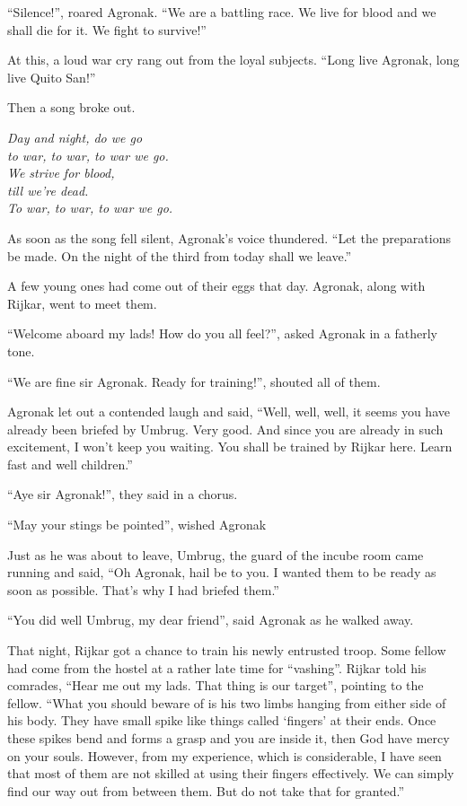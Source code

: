 \documentclass[twoside,11pt,titlepage]{article}
\begin{document}
``Silence!'', roared Agronak. ``We are a battling race. We live for blood and we shall die for it. We fight to survive!''

At this, a loud war cry rang out from the loyal subjects. ``Long live Agronak, long live Quito San!''

Then a song broke out.\\
\medskip
\begin{center}
\emph{Day and night, do we go \\ to war, to war, to war we go. \\We strive for blood, \\till we're dead. \\To war, to war, to war we go.}
\end{center}

As soon as the song fell silent, Agronak's voice thundered. ``Let the preparations be made. On the night of the third from today shall we leave.''

A few young ones had come out of their eggs that day. Agronak, along with Rijkar, went to meet them.

``Welcome aboard my lads! How do you all feel?'', asked Agronak in a fatherly tone.

``We are fine sir Agronak. Ready for training!'', shouted all of them.

Agronak let out a contended laugh and said, ``Well, well, well, it seems you have already been briefed by Umbrug. Very good. And since you are already in such excitement, I won't keep you waiting. You shall be trained by Rijkar here. Learn fast and well children.''

``Aye sir Agronak!'', they said in a chorus.

``May your stings be pointed'', wished Agronak

Just as he was about to leave, Umbrug, the guard of the incube room came running and said, ``Oh Agronak, hail be to you. I wanted them to be ready as soon as possible. That's why I had briefed them.''

``You did well Umbrug, my dear friend'', said Agronak as he walked away.

That night, Rijkar got a chance to train his newly entrusted troop. Some fellow had come from the hostel at a rather late time for ``vashing''. Rijkar told his comrades, ``Hear me out my lads. That thing is our target'', pointing to the fellow. ``What you should beware of is his two limbs hanging from either side of his body. They have small spike like things called `fingers' at their ends. Once these spikes bend and forms a grasp and you are inside it, then God have mercy on your souls. However, from my experience, which is considerable, I have seen that most of them are not skilled at using their fingers effectively. We can simply find our way out from between them. But do not take that for granted.''
\end{document}
